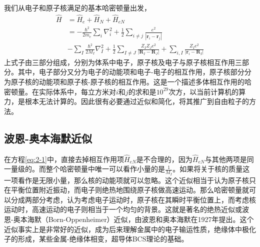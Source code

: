 我们从电子和原子核满足的基本哈密顿量出发，
\begin{equation}
    \label{eq:2-1}
    \begin{aligned}
    \hat{H}&=\hat{H}_e+\hat{H}_N+\hat{H}_{eN}\\
    &=-\frac{\hbar^{2}}{2 m_{e}} \sum_{i} \nabla_{i}^{2}+\frac{1}{2} \sum_{i \neq j} \frac{e^{2}}{\left|\mathbf{r}_{i}-\mathbf{r}_{j}\right|} \\
    &-\sum_{I} \frac{\hbar^{2}}{2 M_{I}} \nabla_{I}^{2}+\frac{1}{2} \sum_{I \neq J} \frac{Z_{I} Z_{J} e^{2}}{\left|\mathbf{R}_{I}-\mathbf{R}_{J}\right|}+\sum_{i, I} \frac{Z_{I} e^{2}}{\left|\mathbf{r}_{i}-\mathbf{R}_{I}\right|}
    \end{aligned}
\end{equation}
上式子由三部分组成，分别为体系中电子，原子核及电子与原子核相互作用三部分。其中，电子部分又分为电子的动能项和电子-电子的相互作用，原子核部分分为原子核的动能项和原子核-原子核的相互作用。这是一个描述多体相互作用的哈密顿量。在实际体系中，每立方米对$i$和$j$的求和是$10^{29}$次方，以当前计算机的算力，是根本无法计算的。因此很有必要通过近似和简化，将其推广到自由粒子的方法。

\subsection{波恩-奥本海默近似}
在方程\ref{eq:2-1}中，直接去掉相互作用项$\hat{H}_{eN}$是不合理的，因为$\hat{H}_{eN}$与其他两项是同一量级的。而整个哈密顿量中唯一可以看作小量的是$\frac{1}{M_I}$。如果将关于核的质量这一项看作是无限小量，那么核的动能项就可以忽略\citep{martin_2004}。这个近似相当于认为原子核只在平衡位置附近振动，而电子则绝热地围绕原子核做高速运动。那么哈密顿量就可以分成两部分考虑，认为考虑电子运动时，原子核在其瞬时平衡位置上，而考虑核运动时，高速运动的电子则相当于一个均匀的背景。这就是著名的绝热近似或波恩-奥本海默（Born-Oppenheimer）近似\citep{Born1927}，由波恩和奥本海默在1927年提出。这个近似事实上是非常好的近似，成为后来理解金属中的电子输运性质，绝缘体中极化子的形成，某些金属-绝缘体相变，超导体BCS理论的基础\citep{Born1927}。

